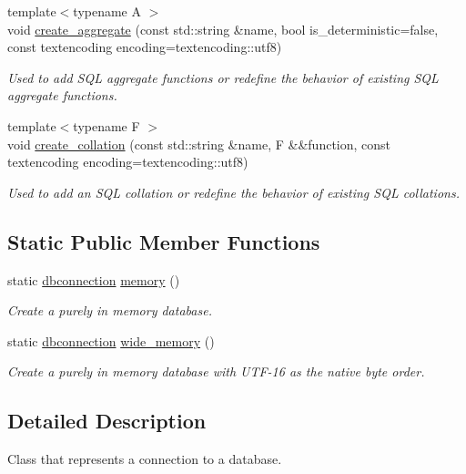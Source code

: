 \begin{DoxyCompactItemize}
{\footnotesize template$<$typename A $>$ }\\void \hyperlink{a00004_ab3e54d1eef4c27734e45a61d27be386b}{create\-\_\-aggregate} (const std\-::string \&name, bool is\-\_\-deterministic=false, const textencoding encoding=textencoding\-::utf8)
\begin{DoxyCompactList}\small\item\em Used to add S\-Q\-L aggregate functions or redefine the behavior of existing S\-Q\-L aggregate functions. \end{DoxyCompactList}\item 
{\footnotesize template$<$typename F $>$ }\\void \hyperlink{a00004_ab8c7b939c1b6d41259aefa3b7475f3bd}{create\-\_\-collation} (const std\-::string \&name, F \&\&function, const textencoding encoding=textencoding\-::utf8)
\begin{DoxyCompactList}\small\item\em Used to add an S\-Q\-L collation or redefine the behavior of existing S\-Q\-L collations. \end{DoxyCompactList}\end{DoxyCompactItemize}
\subsection*{Static Public Member Functions}
\begin{DoxyCompactItemize}
\item 
static \hyperlink{a00004}{dbconnection} \hyperlink{a00004_adc0120a0d5d39eabcffb7d641b0c40dd}{memory} ()
\begin{DoxyCompactList}\small\item\em Create a purely in memory database. \end{DoxyCompactList}\item 
static \hyperlink{a00004}{dbconnection} \hyperlink{a00004_abe5e2bf211f18f2f358f4293d3064679}{wide\-\_\-memory} ()
\begin{DoxyCompactList}\small\item\em Create a purely in memory database with U\-T\-F-\/16 as the native byte order. \end{DoxyCompactList}\end{DoxyCompactItemize}


\subsection{Detailed Description}
Class that represents a connection to a database. 


